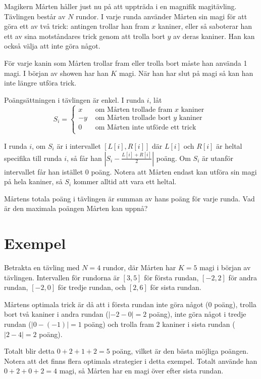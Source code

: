 \newcommand\version{v2}
Magikern Mårten håller just nu på att uppträda i en magnifik magitävling.
Tävlingen består av $N$ rundor.
I varje runda använder Mårten sin magi för att göra ett av två trick: antingen trollar
han fram $x$ kaniner, eller så saboterar han ett av sina motståndares trick genom att
trolla bort $y$ av deras kaniner. Han kan också välja att inte göra något.

För varje kanin som Mårten trollar fram eller trolla bort måste han använda 1 magi.
I början av showen har han $K$ magi. När han har slut på magi så kan han inte längre
utföra trick.

Poängsättningen i tävlingen är enkel. I runda $i$, låt
\[ S_i = \begin{cases}
  x & \text{ om Mårten trollade fram $x$ kaniner } \\
  -y & \text{ om Mårten trollade bort $y$ kaniner } \\
  0 & \text{ om Mårten inte utförde ett trick } \\
\end{cases}
\]

I runda $i$, om $S_i$ är i intervallet $[L[i], R[i]]$ där $L[i]$ och $R[i]$ är heltal specifika
till runda $i$, så får han $|S_i - \frac{L[i] + R[i]}{2}|$ poäng. Om $S_i$ är utanför intervallet
får han istället $0$ poäng. Notera att Mårten endast kan utföra sin magi på hela kaniner,
så $S_i$ kommer alltid att vara ett heltal.

Mårtens totala poäng i tävlingen är summan av hans poäng för varje runda.
Vad är den maximala poängen Mårten kan uppnå?

\section*{Exempel}
Betrakta en tävling med $N = 4$ rundor, där Mårten har $K = 5$ magi i början av tävlingen.
Intervallen för rundorna är $[3, 5]$ för första rundan, $[-2, 2]$ för andra rundan, $[-2, 0]$ för tredje rundan,
och $[2, 6]$ för sista rundan.

Mårtens optimala trick är då att i första rundan inte göra något ($0$ poäng), trolla bort två kaniner i andra rundan ($|-2 - 0 | = 2$ poäng),
inte göra något i tredje rundan ($|0 - (-1)| = 1$ poäng) och trolla fram 2 kaniner i sista rundan ($|2 - 4| = 2$ poäng).

Totalt blir detta $0 + 2 + 1 + 2 = 5$ poäng, vilket är den bästa möjliga poängen. Notera att det finns flera optimala strategier i detta exempel.
Totalt använde han $0 + 2 + 0 + 2 = 4$ magi, så Mårten har en magi över efter sista rundan.

